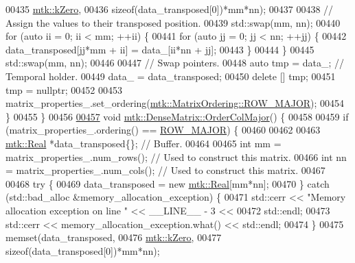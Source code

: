 \begin{DoxyCode}
00435           \hyperlink{group__c01-roots_ga59a451a5fae30d59649bcda274fea271}{mtk::kZero},
00436           \textcolor{keyword}{sizeof}(data\_transposed[0])*mm*nn);
00437 
00438     \textcolor{comment}{// Assign the values to their transposed position.}
00439     std::swap(mm, nn);
00440     \textcolor{keywordflow}{for} (\textcolor{keyword}{auto} ii = 0; ii < mm; ++ii) \{
00441       \textcolor{keywordflow}{for} (\textcolor{keyword}{auto} jj = 0; jj < nn; ++jj) \{
00442         data\_transposed[jj*mm + ii] = data\_[ii*nn + jj];
00443       \}
00444     \}
00445     std::swap(mm, nn);
00446 
00447     \textcolor{comment}{// Swap pointers.}
00448     \textcolor{keyword}{auto} tmp = data\_; \textcolor{comment}{// Temporal holder.}
00449     data\_ = data\_transposed;
00450     \textcolor{keyword}{delete} [] tmp;
00451     tmp = \textcolor{keyword}{nullptr};
00452 
00453     matrix\_properties\_.set\_ordering(\hyperlink{namespacemtk_ga622801bd9f912d0f976c3e383f5f581ca21541962976d7709c26e9cd8385bd648}{mtk::MatrixOrdering::ROW\_MAJOR});
00454   \}
00455 \}
00456 
\hypertarget{mtk__dense__matrix_8cc_source_l00457}{}\hyperlink{classmtk_1_1DenseMatrix_a59b9bea24acf39dca64e8549b3527463}{00457} \textcolor{keywordtype}{void} \hyperlink{classmtk_1_1DenseMatrix_a59b9bea24acf39dca64e8549b3527463}{mtk::DenseMatrix::OrderColMajor}() \{
00458 
00459   \textcolor{keywordflow}{if} (matrix\_properties\_.ordering() == \hyperlink{namespacemtk_ga622801bd9f912d0f976c3e383f5f581ca21541962976d7709c26e9cd8385bd648}{ROW\_MAJOR}) \{
00460 
00462 
00463     \hyperlink{group__c01-roots_gac080bbbf5cbb5502c9f00405f894857d}{mtk::Real} *data\_transposed\{\}; \textcolor{comment}{// Buffer.}
00464 
00465     \textcolor{keywordtype}{int} mm = matrix\_properties\_.num\_rows(); \textcolor{comment}{// Used to construct this matrix.}
00466     \textcolor{keywordtype}{int} nn = matrix\_properties\_.num\_cols(); \textcolor{comment}{// Used to construct this matrix.}
00467 
00468     \textcolor{keywordflow}{try} \{
00469       data\_transposed = \textcolor{keyword}{new} \hyperlink{group__c01-roots_gac080bbbf5cbb5502c9f00405f894857d}{mtk::Real}[mm*nn];
00470     \} \textcolor{keywordflow}{catch} (std::bad\_alloc &memory\_allocation\_exception) \{
00471       std::cerr << \textcolor{stringliteral}{"Memory allocation exception on line "} << \_\_LINE\_\_ - 3 <<
00472         std::endl;
00473       std::cerr << memory\_allocation\_exception.what() << std::endl;
00474     \}
00475     memset(data\_transposed,
00476           \hyperlink{group__c01-roots_ga59a451a5fae30d59649bcda274fea271}{mtk::kZero},
00477           \textcolor{keyword}{sizeof}(data\_transposed[0])*mm*nn);

\end{DoxyCode}
